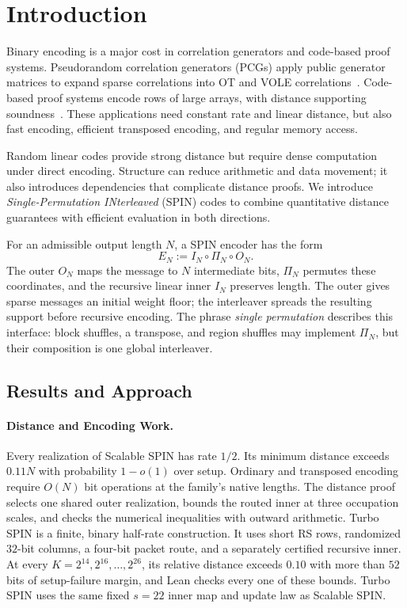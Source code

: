 \section{Introduction}
\label{sec:introduction}

Binary encoding is a major cost in correlation generators and code-based
proof systems. Pseudorandom correlation generators (PCGs) apply public
generator matrices to expand sparse correlations into OT and VOLE
correlations~\cite{bcgi18,bcg19pcg}. Code-based proof systems encode rows
of large arrays, with distance supporting soundness~\cite{brakedown23,blaze25}.
These applications need constant rate and linear distance, but also fast
encoding, efficient transposed encoding, and regular memory access.

Random linear codes provide strong distance but require dense computation
under direct encoding. Structure can reduce arithmetic and data movement;
it also introduces dependencies that complicate distance proofs.
We introduce \emph{Single-Permutation INterleaved} (SPIN) codes to combine
quantitative distance guarantees with efficient evaluation in both directions.

For an admissible output length $N$, a SPIN encoder has the form
\begin{equation}
  E_N := I_N\circ\Pi_N\circ O_N.
  \label{eq:intro-spin-composition}
\end{equation}
The outer $O_N$ maps the message to $N$ intermediate bits, $\Pi_N$ permutes
these coordinates, and the recursive linear inner $I_N$ preserves length.
The outer gives sparse messages an initial weight floor; the interleaver
spreads the resulting support before recursive encoding. The phrase \emph{single permutation} describes this
interface: block shuffles, a transpose, and region shuffles may implement
$\Pi_N$, but their composition is one global interleaver.

\subsection{Results and Approach}

\paragraph{Distance and Encoding Work.}
Every realization of Scalable SPIN has rate $1/2$.
Its minimum distance exceeds $0.11N$ with probability $1-o(1)$ over setup.
Ordinary and transposed encoding require $O(N)$ bit operations at the family's
native lengths. The distance proof selects one shared outer realization,
bounds the routed inner at three occupation scales, and checks the
numerical inequalities with outward arithmetic.
Turbo SPIN is a finite, binary half-rate construction. It uses
short RS rows, randomized $32$-bit columns, a four-bit packet route, and
a separately certified recursive inner. At every $K=2^{14},2^{16},\ldots,2^{26}$,
its relative distance exceeds $0.10$ with more than $52$ bits of
setup-failure margin, and Lean checks every one of these bounds. Turbo
SPIN uses the same fixed $s=22$ inner map and update law as Scalable SPIN.

